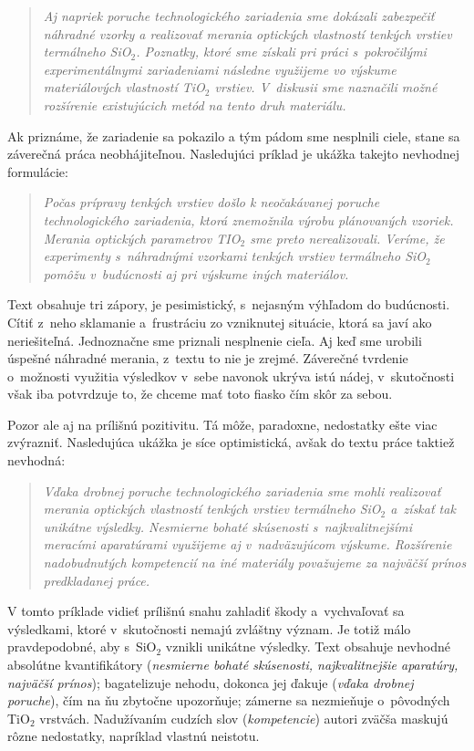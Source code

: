 \begin{quote}
  \emph{Aj napriek poruche technologického zariadenia sme 
  dokázali zabezpečiť náhradné vzorky a realizovať merania 
  optických vlastností tenkých vrstiev termálneho 
  SiO$_\mathit{2}$.
  Poznatky, ktoré sme získali pri práci s~pokročilými 
  experimentálnymi zariadeniami následne využijeme vo výskume 
  materiálových vlastností TiO$_\mathit{2}$ vrstiev.
  V~diskusii sme naznačili možné rozšírenie existujúcich
  metód na tento druh materiálu.}
\end{quote}

Ak priznáme, že zariadenie sa pokazilo
a tým pádom sme nesplnili ciele,
stane sa záverečná práca neobhájiteľnou.
Nasledujúci príklad je ukážka takejto nevhodnej formulácie:

\begin{quote}
  \emph{Počas prípravy tenkých vrstiev došlo k neočakávanej 
  poruche technologického zariadenia,
  ktorá znemožnila výrobu plánovaných vzoriek.
  Merania optických parametrov TIO$_\mathit2$
  sme preto nerealizovali.
  Veríme, že experimenty s~náhradnými vzorkami tenkých vrstiev 
  termálneho SiO$_\mathit2$ pomôžu v~budúcnosti
  aj pri výskume iných materiálov.}
\end{quote}

Text obsahuje tri zápory, je pesimistický,
s~nejasným výhľadom do budúcnosti.
Cítiť z~neho sklamanie a~frustráciu zo vzniknutej situácie,
ktorá sa javí ako neriešiteľná.
Jednoznačne sme priznali nesplnenie cieľa.
Aj keď sme urobili úspešné náhradné merania,
z~textu to nie je zrejmé.
Záverečné tvrdenie o~možnosti využitia výsledkov
v~sebe navonok ukrýva istú nádej,
v~skutočnosti však iba potvrdzuje to,
že chceme mať toto fiasko čím skôr za sebou.

Pozor ale aj na prílišnú pozitivitu.
Tá môže, paradoxne, nedostatky ešte viac zvýrazniť.
Nasledujúca ukážka je síce optimistická,
avšak do textu práce taktiež nevhodná:

\begin{quote}
  \emph{Vďaka drobnej poruche technologického zariadenia sme 
  mohli realizovať merania optických vlastností tenkých vrstiev 
  termálneho SiO$_\mathit2$ a~získať tak unikátne výsledky. 
  Nesmierne bohaté skúsenosti s~najkvalitnejšími meracími 
  aparatúrami využijeme aj v~nadväzujúcom výskume.
  Rozšírenie nadobudnutých kompetencií na iné materiály 
  považujeme za najväčší prínos predkladanej práce.}
\end{quote}

V tomto príklade vidieť prílišnú snahu zahladiť škody
a~vychvaľovať sa výsledkami,
ktoré v~skutočnosti nemajú zvláštny význam.
Je totiž málo pravdepodobné,
aby s~SiO$_2$ vznikli unikátne výsledky.
Text obsahuje nevhodné absolútne kvantifikátory
(\emph{nesmierne bohaté skúsenosti, najkvalitnejšie aparatúry, 
najväčší prínos});
bagatelizuje nehodu, dokonca jej ďakuje
(\emph{vďaka drobnej poruche}),
čím na ňu zbytočne upozorňuje;
zámerne sa nezmieňuje o~pôvodných TiO$_2$ vrstvách.
Nadužívaním cudzích slov (\emph{kompetencie})
autori zväčša maskujú rôzne nedostatky,
napríklad vlastnú neistotu.

